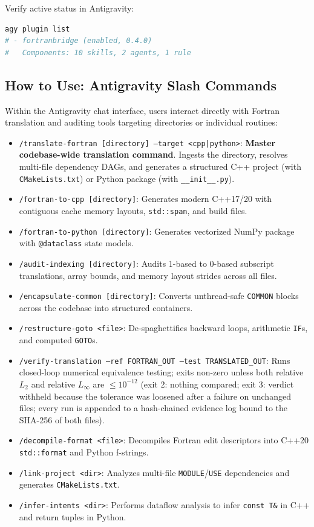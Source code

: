 \documentclass[11pt,a4paper]{article}
\theoremstyle{definition}
\begin{document}
Verify active status in Antigravity:
\begin{lstlisting}[language=bash]
agy plugin list
# - fortranbridge (enabled, 0.4.0)
#   Components: 10 skills, 2 agents, 1 rule
\end{lstlisting}

\subsection{How to Use: Antigravity Slash Commands}
Within the Antigravity chat interface, users interact directly with Fortran translation and auditing tools targeting directories or individual routines:
\begin{itemize}
    \item \texttt{/translate-fortran [directory] --target <cpp|python>}: \textbf{Master codebase-wide translation command}. Ingests the directory, resolves multi-file dependency DAGs, and generates a structured C++ project (with \texttt{CMakeLists.txt}) or Python package (with \texttt{\_\_init\_\_.py}).
    \item \texttt{/fortran-to-cpp [directory]}: Generates modern C++17/20 with contiguous cache memory layouts, \texttt{std::span}, and build files.
    \item \texttt{/fortran-to-python [directory]}: Generates vectorized NumPy package with \texttt{@dataclass} state models.
    \item \texttt{/audit-indexing [directory]}: Audits 1-based to 0-based subscript translations, array bounds, and memory layout strides across all files.
    \item \texttt{/encapsulate-common [directory]}: Converts unthread-safe \texttt{COMMON} blocks across the codebase into structured containers.
    \item \texttt{/restructure-goto <file>}: De-spaghettifies backward loops, arithmetic \texttt{IF}s, and computed \texttt{GOTO}s.
    \item \texttt{/verify-translation --ref FORTRAN\_OUT --test TRANSLATED\_OUT}: Runs closed-loop numerical equivalence testing; exits non-zero unless both relative $L_2$ and relative $L_\infty$ are $\le 10^{-12}$ (exit 2: nothing compared; exit 3: verdict withheld because the tolerance was loosened after a failure on unchanged files; every run is appended to a hash-chained evidence log bound to the SHA-256 of both files).
    \item \texttt{/decompile-format <file>}: Decompiles Fortran edit descriptors into C++20 \texttt{std::format} and Python f-strings.
    \item \texttt{/link-project <dir>}: Analyzes multi-file \texttt{MODULE}/\texttt{USE} dependencies and generates \texttt{CMakeLists.txt}.
    \item \texttt{/infer-intents <dir>}: Performs dataflow analysis to infer \texttt{const T\&} in C++ and return tuples in Python.
\end{itemize}
\end{document}
